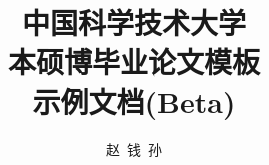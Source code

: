 \documentclass[bachelor,euler,twoside,openright]{ustcthesis}
\title{中国科学技术大学\\本硕博毕业论文模板\\示例文档(Beta)}%
\author{赵\ 钱\ 孙}
\begin{document}
  \maketitle

\frontmatter
\makeatletter
\ifustc@bachelor
	
	
	\tableofcontents

	\ustclot
	\ustclof
	\ustcloa
	
\else
	\tableofcontents

	\ustclot
	\ustclof
	\ustcloa
	
\fi
\makeatother

\mainmatter

  
  
  

\backmatter

  
  \nocite{*} %

  \begin{appendix}
    
  \end{appendix}

  \makeatletter
  \ifustc@bachelor\relax\else
    
  \fi
  \makeatother
\end{document}
